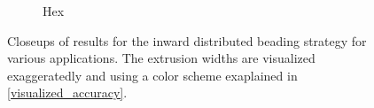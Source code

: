 \begin{figure}
\begin{subfigure}{\figwidth}
\caption{Hex}\label{applications_hex}
\end{subfigure}
\caption{
Closeups of results for the inward distributed beading strategy for various applications.
The extrusion widths are visualized exaggeratedly and using a color scheme exaplained in \cref{visualized_accuracy}.
}
\label{application_closeups}
\end{figure}


